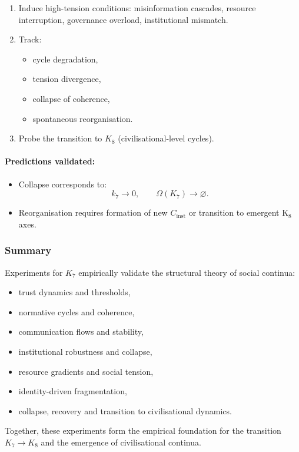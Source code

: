 \begin{enumerate}
    \item Induce high-tension conditions:
          misinformation cascades, resource interruption,
          governance overload, institutional mismatch.
    \item Track:
          \begin{itemize}
              \item cycle degradation,
              \item tension divergence,
              \item collapse of coherence,
              \item spontaneous reorganisation.
          \end{itemize}
    \item Probe the transition to $K_8$ (civilisational-level cycles).
\end{enumerate}

\paragraph{Predictions validated:}

\begin{itemize}
    \item Collapse corresponds to:
          \[
             k_7 \rightarrow 0,\qquad
             \Omega(K_7) \rightarrow \varnothing.
          \]
    \item Reorganisation requires formation of new $C_{\mathrm{inst}}$
          or transition to emergent K$_8$ axes.
\end{itemize}



\subsubsection{Summary}

Experiments for $K_7$ empirically validate the structural theory of
social continua:

\begin{itemize}
    \item trust dynamics and thresholds,
    \item normative cycles and coherence,
    \item communication flows and stability,
    \item institutional robustness and collapse,
    \item resource gradients and social tension,
    \item identity-driven fragmentation,
    \item collapse, recovery and transition to civilisational dynamics.
\end{itemize}

Together, these experiments form the empirical foundation for the
transition $K_7 \rightarrow K_8$ and the emergence of civilisational
continua.
